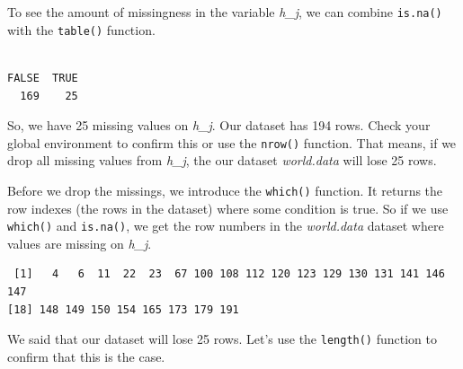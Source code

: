 \documentclass[]{book}
\newenvironment{Shaded}{\begin{snugshade}}{\end{snugshade}}
\newcommand{\KeywordTok}[1]{\textcolor[rgb]{0.13,0.29,0.53}{\textbf{#1}}}
\newcommand{\OperatorTok}[1]{\textcolor[rgb]{0.81,0.36,0.00}{\textbf{#1}}}
\newcommand{\NormalTok}[1]{#1}
\theoremstyle{definition}
\theoremstyle{definition}
\theoremstyle{definition}
\theoremstyle{remark}
\begin{document}
To see the amount of missingness in the variable \emph{h\_j}, we can
combine \texttt{is.na()} with the \texttt{table()} function.

\begin{Shaded}
\end{Shaded}

\begin{verbatim}

FALSE  TRUE 
  169    25 
\end{verbatim}

So, we have 25 missing values on \emph{h\_j}. Our dataset has 194 rows.
Check your global environment to confirm this or use the \texttt{nrow()}
function. That means, if we drop all missing values from \emph{h\_j},
the our dataset \emph{world.data} will lose 25 rows.

Before we drop the missings, we introduce the \texttt{which()} function.
It returns the row indexes (the rows in the dataset) where some
condition is true. So if we use \texttt{which()} and \texttt{is.na()},
we get the row numbers in the \emph{world.data} dataset where values are
missing on \emph{h\_j}.

\begin{Shaded}
\end{Shaded}

\begin{verbatim}
 [1]   4   6  11  22  23  67 100 108 112 120 123 129 130 131 141 146 147
[18] 148 149 150 154 165 173 179 191
\end{verbatim}

We said that our dataset will lose 25 rows. Let's use the
\texttt{length()} function to confirm that this is the case.

\begin{Shaded}
\end{Shaded}
\end{document}
